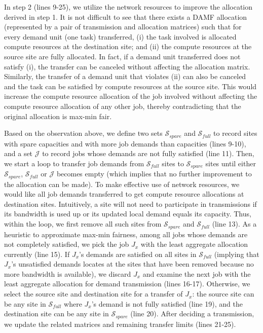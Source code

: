 In step 2 (lines 9-25), we utilize the network resources to improve the allocation derived in step 1. It is not difficult to see that there exists a DAMF allocation (represented by a pair of transmission and allocation matrices) such that for every demand unit (one task) transferred, (i) the task involved is allocated compute resources at the destination site; and (ii) the compute resources at the source site are fully allocated. In fact, if a demand unit transferred does not satisfy (i), the transfer can be canceled without affecting the allocation matrix. Similarly, the transfer of a demand unit that violates (ii) can also be canceled and the task can be satisfied by compute resources at the source site. This would increase the compute resource allocation of the job involved without affecting the compute resource allocation of any other job, thereby contradicting that the original allocation is max-min fair.

Based on the observation above, we define two sets $\mathcal{S}_{spare}$ and $\mathcal{S}_{full}$ to record sites with spare capacities and with more job demands than capacities (lines 9-10), and a set $\mathcal{J}$ to record jobs whose demands are not fully satisfied (line 11). Then, we start a loop to transfer job demands from $\mathcal{S}_{full}$ sites to $\mathcal{S}_{spare}$ sites until either $\mathcal{S}_{spare}$, $\mathcal{S}_{full}$ or $\mathcal{J}$ becomes empty (which implies that no further improvement to the allocation can be made). To make effective use of network resources, we would like all job demands transferred to get compute resource allocations at destination sites. Intuitively, a site will not need to participate in transmissions if its bandwidth is used up or its updated local demand equals its capacity. Thus, within the loop, we first remove all such sites from $\mathcal{S}_{spare}$ and $\mathcal{S}_{full}$ (line 13). As a heuristic to approximate max-min fairness, among all jobs whose demands are not completely satisfied, we pick the job $J_x$ with the least aggregate allocation currently (line 15). If $J_x$'s demands are satisfied on all sites in $\mathcal{S}_{full}$ (implying that $J_x$'s unsatisfied demands locates at the sites that have been removed because no more bandwidth is available), we discard $J_x$ and examine the next job with the least aggregate allocation for demand transmission (lines 16-17). Otherwise, we select the source site and destination site for a transfer of $J_x$: the source site can be any site in $\mathcal{S}_{full}$ where $J_x$'s demand is not fully satisfied (line 19), and the destination site can be any site in $\mathcal{S}_{spare}$ (line 20). After deciding a transmission, we update the related matrices and remaining transfer limits (lines 21-25).

